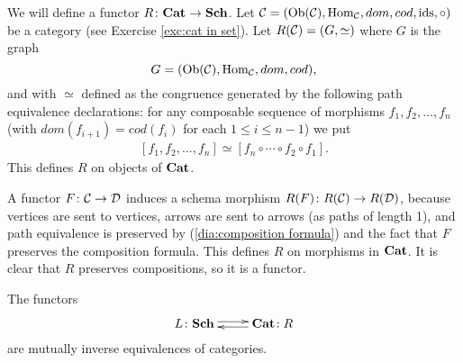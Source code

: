 \begin{construction}

We will define a functor $R\colon{\bf Cat}\rightarrow{\bf Sch}$. Let $\mathcal{C}=(\textnormal{Ob}(\mathcal{C}),\textnormal{Hom}_\mathcal{C},dom,cod,\textnormal{ids},\circ)$ be a category (see Exercise \ref{exc:cat in set}). Let $R(\mathcal{C})=(G,\simeq)$ where $G$ is the graph $$G=(\textnormal{Ob}(\mathcal{C}),\textnormal{Hom}_\mathcal{C},dom,cod),$$ and with $\simeq$ defined as the congruence generated by the following path equivalence declarations: for any composable sequence of morphisms $f_1,f_2,\ldots,f_n$ (with $dom(f_{i+1})=cod(f_i)$ for each $1\leq i\leq n-1$) we put 
\begin{align}\label{dia:composition formula}
[f_1,f_2,\ldots,f_n]\simeq [f_n\circ\cdots\circ f_2\circ f_1].
\end{align} 
This defines $R$ on objects of ${\bf Cat}$. 

A functor $F\colon\mathcal{C}\rightarrow\mathcal{D}$ induces a schema morphism $R(F)\colon R(\mathcal{C})\rightarrow R(\mathcal{D})$, because vertices are sent to vertices, arrows are sent to arrows (as paths of length 1), and path equivalence is preserved by (\ref{dia:composition formula}) and the fact that $F$ preserves the composition formula. This defines $R$ on morphisms in ${\bf Cat}$. It is clear that $R$ preserves compositions, so it is a functor.

\end{construction}

\begin{theorem}\label{thm:equivalence of categories and schemas}

The functors $$\xymatrix{L\taking\Sch\ar@<.5ex>[r]&\Cat\!:R\ar@<.5ex>[l]}$$ are mutually inverse equivalences of categories.

\end{theorem}

